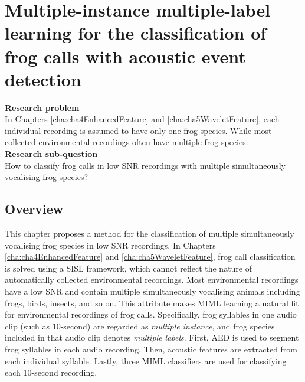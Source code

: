 \chapter{Multiple-instance multiple-label learning for the classification of frog calls with acoustic event detection}
\label{cha:cha6MIML}

\textbf{Research problem}
\\
In Chapters \ref{cha:cha4EnhancedFeature} and \ref{cha:cha5WaveletFeature}, each individual recording is assumed to have only one frog species. While most collected environmental recordings often have multiple frog species.
\\
\textbf{Research sub-question}
\\
How to classify frog calls in low SNR recordings with multiple simultaneously vocalising frog species?


\section{Overview}
\label{sec:intro}

This chapter proposes a method for the classification of multiple simultaneously vocalising frog species in low SNR recordings. In Chapters \ref{cha:cha4EnhancedFeature} and \ref{cha:cha5WaveletFeature}, frog call classification is solved using a SISL framework, which cannot reflect the nature of automatically collected environmental recordings. Most environmental recordings have a low SNR and contain multiple simultaneously vocalising animals including frogs, birds, insects, and so on. This attribute makes MIML learning a natural fit for environmental recordings of frog calls. Specifically, frog syllables in one audio clip (such as 10-second) are regarded as \textit{multiple instance}, and frog species included in that audio clip denotes \textit{multiple labels}. 
First, AED is used to segment frog syllables in each audio recording.
Then, acoustic features are extracted from each individual syllable. Lastly, three MIML classifiers are used for classifying each 10-second recording.



